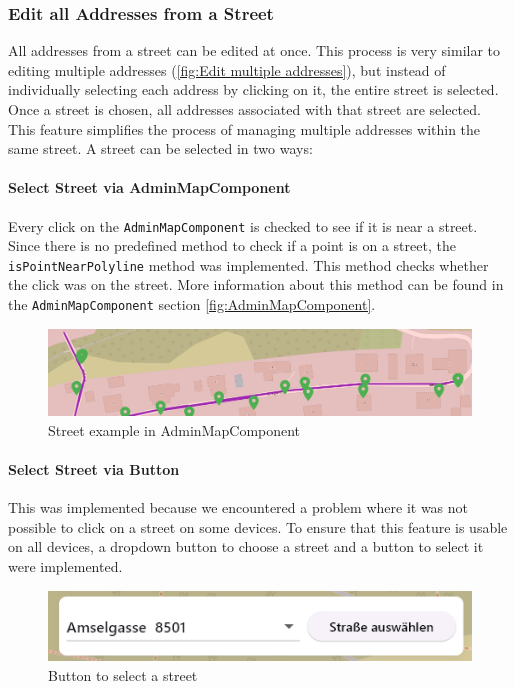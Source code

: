 \subsubsection{Edit all Addresses from a Street}
All addresses from a street can be edited at once. This process is very similar to editing multiple addresses (\ref{fig:Edit multiple addresses}), but instead of individually selecting each address by clicking on it, the entire street is selected. Once a street is chosen, all addresses associated with that street are selected. This feature simplifies the process of managing multiple addresses within the same street. A street can be selected in two ways:



\paragraph{Select Street via AdminMapComponent}
Every click on the \texttt{AdminMapComponent} is checked to see if it is near a street. Since there is no predefined method to check if a point is on a street, the \texttt{isPointNearPolyline} method was implemented. This method checks whether the click was on the street. More information about this method can be found in the \texttt{AdminMapComponent} section \ref{fig:AdminMapComponent}.\

\begin{figure}[H]
    \centering
    \includegraphics[width=0.6\linewidth]{images/AdminPanel/Street.png}
    \caption{Street example in AdminMapComponent}
\end{figure}


\paragraph{Select Street via Button}
This was implemented because we encountered a problem where it was not possible to click on a street on some devices. To ensure that this feature is usable on all devices, a dropdown button to choose a street and a button to select it were implemented.\\

\begin{figure}[H]
    \centering
    \includegraphics[width=0.6\linewidth]{images/AdminPanel/SelectStreetButton.png}
    \caption{Button to select a street}
\end{figure}


